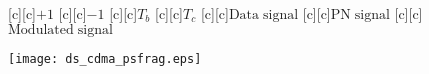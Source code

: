 \documentclass{article}
\begin{document}
\begin{figure}[htb]
  \begin{center}

        [c][c]{$+1$}
        [c][c]{$-1$}
        [c][c]{$T_b$}
        [c][c]{\hspace{1.5mm}\tiny{$T_c$}}
        [c][c]{$\mathrm{Data\;signal}$}
        [c][c]{$\mathrm{PN\;signal}$}
        [c][c]{$\mathrm{Modulated\;signal}$}

    \texttt{[image: ds\_cdma\_psfrag.eps]}
    \end{center}
\end{figure}
\end{document}
